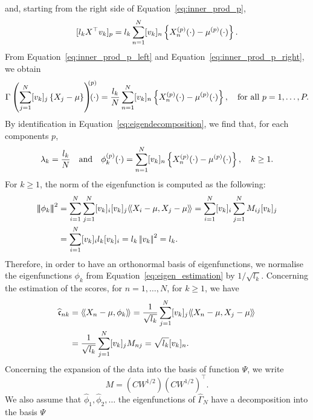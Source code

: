 and, starting from the right side of Equation~\eqref{eq:inner_prod_p},
\begin{equation}\label{eq:inner_prod_p_right}
    [l_k X^\top v_k]_p = l_k \sum_{n = 1}^N [v_{k}]_n \left\{X_n^{(p)}(\cdot) - \mu^{(p)}(\cdot)\right\}.
\end{equation}
From Equation~\eqref{eq:inner_prod_p_left} and Equation~\eqref{eq:inner_prod_p_right}, we obtain
\begin{equation}
    \Gamma\left(\sum_{j = 1}^N [v_{k}]_j \left\{X_j - \mu\right\}\right)^{\mkern-9mu(p)}\mkern-18mu(\cdot) = \frac{l_k}{N} \sum_{n = 1}^N [v_{k}]_n \left\{X_n^{(p)}(\cdot) - \mu^{(p)}(\cdot)\right\}, \quad\text{for all}~ p = 1, \dots, P.
\end{equation}
By identification in Equation~\eqref{eq:eigendecomposition}, we find that, for each components $p$,
\begin{equation}\label{eq:eigen_estimation}
\lambda_k = \frac{l_k}{N} \quad\text{and}\quad \phi_k^{(p)}(\cdot) = \sum_{n = 1}^N [v_{k}]_n \left\{X_n^{(p)}(\cdot) - \mu^{(p)}(\cdot)\right\}, \quad k \geq 1.
\end{equation}
For $k \geq 1$, the norm of the eigenfunction is computed as the following:
\begin{align*}
\normH{\phi_k}^2 &= \sum_{i = 1}^N \sum_{j = 1}^N [v_{k}]_i [v_{k}]_j\inH{X_i - \mu}{X_j - \mu} = \sum_{i = 1}^N [v_{k}]_i \sum_{j = 1}^N M_{ij} [v_{k}]_j \\
    &= \sum_{i = 1}^N [v_{k}]_i l_k [v_{k}]_i = l_k \normLp{v_k}^2 = l_k. \\
\end{align*}
Therefore, in order to have an orthonormal basis of eigenfunctions, we normalise the eigenfunctions $\phi_k$ from Equation~\eqref{eq:eigen_estimation} by $1 / \sqrt{l_k}$.
Concerning the estimation of the scores, for $n = 1, \dots, N$, for $k \geq 1$, we have
\begin{align}
    \widehat{\mathfrak{c}}_{nk} &= \langle\!\langle X_n - \mu, \phi_k\rangle\!\rangle = \frac{1}{\sqrt{l_k}}\sum_{j = 1}^N [v_{k}]_j \langle\!\langle X_n - \mu, X_j - \mu\rangle\!\rangle\\
    &= \frac{1}{\sqrt{l_k}}\sum_{j = 1}^N [v_{k}]_j M_{nj} = \sqrt{l_k}[v_{k}]_n.\\
\end{align}
Concerning the expansion of the data into the basis of function $\Psi$, we write 
\begin{equation}
    M = \left(CW^{1/2}\right)\left(CW^{1/2}\right)^\top.
\end{equation}
We also assume that $\widehat{\phi}_1, \widehat{\phi}_2, \dots$ the eigenfunctions of $\widehat{\Gamma}_N$ have a decomposition into the basis $\Psi$
